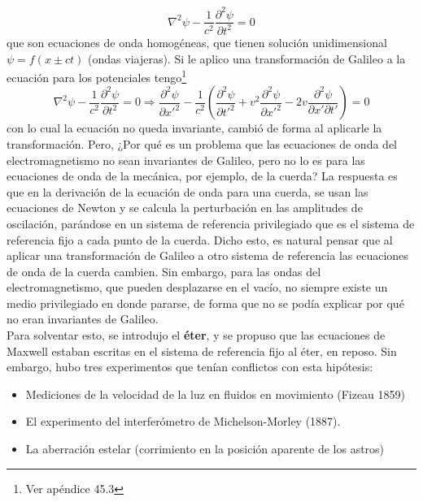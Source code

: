\begin{equation*}
    \nabla^{2}\psi - \frac{1}{c^{2}}\frac{\partial^{2}\psi}{\partial t^{2}} = 0
\end{equation*}
que son ecuaciones de onda homogéneas, que tienen solución unidimensional $\psi = f(x \pm ct)$ (ondas viajeras). Si le aplico una transformación de Galileo a la ecuación para los potenciales tengo\footnote{Ver apéndice 45.3}
\begin{equation*}
    \nabla^{2}\psi - \frac{1}{c^{2}}\frac{\partial^{2}\psi}{\partial t^{2}} = 0
    \Longrightarrow 
    \frac{\partial^{2} \psi}{\partial x'^{2}} 
    - \frac{1}{c^{2}}
    \left(
        \frac{\partial^{2}\psi}{\partial t'^{2}}
        +v^{2}\frac{\partial^{2}\psi}{\partial x'^{2}}
        -2v\frac{\partial^{2}\psi}{\partial x'\partial t'}
    \right)
    = 0
\end{equation*}
con lo cual la ecuación no queda invariante, cambió de forma al aplicarle la transformación. Pero, ¿Por qué es un problema que las ecuaciones de onda del electromagnetismo no sean invariantes de Galileo, pero no lo es para las ecuaciones de onda de la mecánica, por ejemplo, de la cuerda? La respuesta es que en la derivación de la ecuación de onda para una cuerda, se usan las ecuaciones de Newton y se calcula la perturbación en las amplitudes de oscilación, parándose en un sistema de referencia privilegiado que es el sistema de referencia fijo a cada punto de la cuerda. Dicho esto, es natural pensar que al aplicar una transformación de Galileo a otro sistema de referencia las ecuaciones de onda de la cuerda cambien. Sin embargo, para las ondas del electromagnetismo, que pueden desplazarse en el vacío, no siempre existe un medio privilegiado en donde pararse, de forma que no se podía explicar por qué no eran invariantes de Galileo.\\
\indent Para solventar esto, se introdujo el \textbf{éter}, y se propuso que las ecuaciones de Maxwell estaban escritas en el sistema de referencia fijo al éter, en reposo. Sin embargo, hubo tres experimentos que tenían conflictos con esta hipótesis:
\begin{itemize}
    \item Mediciones de la velocidad de la luz en fluidos en movimiento (Fizeau 1859)
    \item El experimento del interferómetro de Michelson-Morley (1887).
    \item La aberración estelar (corrimiento en la posición aparente de los astros)
\end{itemize}
